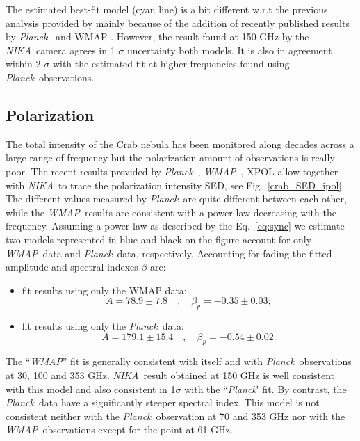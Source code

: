 \documentclass[twocolumn,traditabstract]{aa}
\def\NIKA{\textit{NIKA}}
\def\Planck{\textit{Planck}}
\def\WMAP{\textit{WMAP}}
\begin{document}
The estimated best-fit model (cyan line) is a bit different w.r.t the previous analysis provided by \citep{macias2010} mainly because of the addition of recently published results by \Planck\ \citep{2015arXiv150702058P} and  WMAP \citep{2011ApJS..192...19W}. However, the result found at 150 GHz by the \NIKA\ camera agrees in 1 $\sigma$ uncertainty both models. It is also in agreement within 2 $\sigma$ with the estimated fit at higher frequencies found using \Planck\ observations.

\subsection{Polarization}
The total intensity of the Crab nebula has been monitored along decades across a large range of frequency but the polarization amount of observations is really poor.
The recent results provided by \Planck\ \citep{2015arXiv150702058P}, \WMAP\ \citep{2011ApJS..192...19W}, XPOL \citep{aumont2010} allow together with \NIKA\ to trace the polarization intensity SED, see Fig.~\ref{crab_SED_ipol}. The different values measured by \Planck\ are quite different between each other, while the \WMAP\ results are consistent with a power law decreasing with the frequency. 
Assuming a power law as described by the Eq.~\ref{eq:sync} we estimate two models represented in blue and black on the figure account for only \WMAP\ data and \Planck\ data, respectively.
Accounting for fading the fitted amplitude and spectral indexes $\beta$ are:
\begin{itemize}
\item fit results using only the WMAP data:
\begin{equation}
A = 78.9\pm7.8 \quad , \quad \beta_p = -0.35\pm0.03;
\end{equation}
\item fit results using only the \Planck\ data:
\begin{equation}
A = 179.1\pm15.4 \quad , \quad \beta_p = -0.54\pm0.02.
\end{equation}
\end{itemize}
The ``\WMAP'' fit is generally consistent with itself and with \Planck\ observations at 30, 100 and 353 GHz. \NIKA\ result obtained at 150 GHz is well consistent with this model and also consistent in 1$\sigma$ with the ``\Planck\'' fit. By contrast, the \Planck\ data have a significantly steeper spectral index. This model is not consistent neither with the \Planck\ observation at 70 and 353 GHz nor with the \WMAP\ observations except for the point at 61 GHz.
\end{document}
